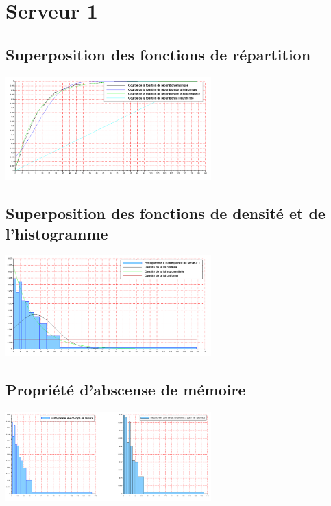 \documentclass{article}
\begin{document}
\paragraph{}

\section{Serveur 1}

\subsection{Superposition des fonctions de répartition}
\begin{center}
\includegraphics[width=300px]{img/S1_repartitions.png}
\end{center}
\paragraph{}

\subsection{Superposition des fonctions de densité et de l'histogramme}
\begin{center}
\includegraphics[width=300px]{img/S1_densite.png}
\end{center}
\paragraph{}

\subsection{Propriété d'abscense de mémoire}
\begin{center}
\includegraphics[width=300px]{img/S1_mem.png}
\end{center}
\end{document}
